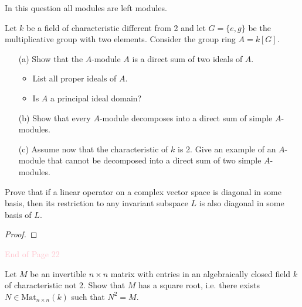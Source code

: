 \begin{prob}[F2018-Q4]
    In this question all modules are left modules.

Let \( k \) be a field of characteristic different from 2 and let \( G = \{e, g\} \) be the multiplicative group with two elements. Consider the group ring \( A = k[G] \).

\begin{enumerate}
    \item[(a)] Show that the \( A \)-module \( A \) is a direct sum of two ideals of \( A \).
    \begin{itemize}
        \item List all proper ideals of \( A \).
        \item Is \( A \) a principal ideal domain?
    \end{itemize}
    
    \item[(b)] Show that every \( A \)-module decomposes into a direct sum of simple \( A \)-modules.
    
    \item[(c)] Assume now that the characteristic of \( k \) is 2. Give an example of an \( A \)-module that cannot be decomposed into a direct sum of two simple \( A \)-modules.
\end{enumerate}
\end{prob}


\begin{prob}[S2003-Q3]
    Prove that if a linear operator on a complex vector space is diagonal in some basis, then its restriction to any invariant subspace \( L \) is also diagonal in some basis of \( L \).
\end{prob}
\begin{proof}
    
\end{proof}


\begin{center}
    \textcolor{pink}{End of Page 22}
\end{center}


\begin{prob}[S2017-Q4]
    Let \(M\) be an invertible \(n\times n\) matrix with entries in an algebraically closed field \(k\) of characteristic not 2. Show that \(M\) has a square root, i.e. there exists \(N\in\text{Mat}_{n\times n}(k)\) such that \(N^{2}=M\).
\end{prob}


